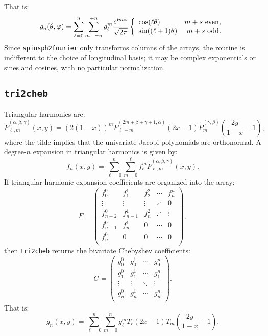 \documentclass{article}
\def\ii{{\rm i}}
\begin{document}
That is:
\begin{equation}
g_n(\theta,\varphi) = \sum_{\ell=0}^n\sum_{m=-n}^{+n} g_\ell^m \frac{e^{\ii m\varphi}}{\sqrt{2\pi}} \left\{\begin{array}{lr} \cos(\ell\theta) & m+s~{\rm even},\\ \sin((\ell+1)\theta) & m+s~{\rm odd}.\end{array}\right.
\end{equation}
Since {\tt spinsph2fourier} only transforms columns of the arrays, the routine is indifferent to the choice of longitudinal basis; it may be complex exponentials or sines and cosines, with no particular normalization.

\subsection{{\tt tri2cheb}}

Triangular harmonics are:
\begin{equation}
\tilde{P}_{\ell,m}^{(\alpha,\beta,\gamma)}(x,y) = (2(1-x))^m \tilde{P}_{\ell-m}^{(2m+\beta+\gamma+1,\alpha)}(2x-1) \tilde{P}_m^{(\gamma,\beta)}\left(\frac{2y}{1-x}-1\right),
\end{equation}
where the tilde implies that the univariate Jacobi polynomials are orthonormal. A degree-$n$ expansion in triangular harmonics is given by:
\begin{equation}
f_n(x,y) = \sum_{\ell=0}^{n}\sum_{m = 0}^\ell f_\ell^m \tilde{P}_{\ell,m}^{(\alpha,\beta,\gamma)}(x,y).
\end{equation}
If triangular harmonic expansion coefficients are organized into the array:
\[
F = \begin{pmatrix}
f_0^0 & f_1^1 & f_2^2 & \cdots & f_n^n\\
\vdots & \vdots &  \vdots & \iddots & 0\\
f_{n-2}^0 & f_{n-1}^1 & f_n^2 & \iddots & \vdots\\
f_{n-1}^0 & f_n^1 & 0 & \cdots & 0\\
f_n^0 & 0 & 0 & \cdots & 0\\
\end{pmatrix},
\]
then {\tt tri2cheb} returns the bivariate Chebyshev coefficients:
\[
G = \begin{pmatrix}
g_0^0 & g_0^1 & \cdots & g_0^n\\
g_1^0 & g_1^1 & \cdots & g_1^n\\
\vdots & \vdots & \ddots & \vdots\\
g_n^0 & g_n^1 & \cdots & g_n^n\\
\end{pmatrix}.
\]
That is:
\[
g_n(x,y) = \sum_{\ell=0}^n\sum_{m=0}^n g_\ell^m T_\ell(2x-1) T_m\left(\frac{2y}{1-x}-1\right).
\]
\end{document}
